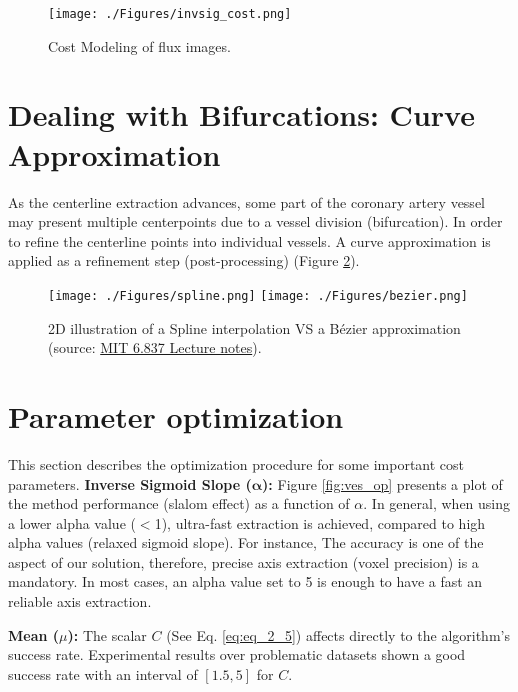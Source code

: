 \begin{figure}[ht]
	\centering
		\texttt{[image: ./Figures/invsig\_cost.png]}
	\caption[Cost Function]{Cost Modeling of flux images.}
	\label{fig:inv_cost}
\end{figure}

\section{Dealing with Bifurcations: Curve Approximation}\label{cent:bezi}

As the centerline extraction advances, some part of the coronary artery vessel may present multiple centerpoints due to a vessel division (bifurcation). In order to refine the centerline points into individual vessels. A curve approximation \citep{Bartels1998} is applied as a refinement step (post-processing) (Figure \ref{fig:sp_vs_bz}). 

\begin{figure}[ht]
	\centering
		\texttt{[image: ./Figures/spline.png]}
		\texttt{[image: ./Figures/bezier.png]}
	\caption[Spline interpolation VS B\'ezier approximation]{2D illustration of a Spline interpolation VS a B\'ezier approximation  (source: \href{http://ocw.mit.edu/courses/electrical-engineering-and-computer-science/6-837-computer-graphics-fall-2003/index.htm}{MIT 6.837 Lecture notes}).}
	\label{fig:sp_vs_bz}
\end{figure}


\section{Parameter optimization}\label{cent:opt}

This section describes the optimization procedure for some important cost parameters.
\textbf{Inverse Sigmoid Slope (}$\mathbf{\alpha}$\textbf{):} Figure \ref{fig:ves_op} presents a plot of the method performance (slalom effect) as a function of $\alpha$. In general, when using a lower alpha value ($<$1), ultra-fast extraction is achieved, compared to high alpha values (relaxed sigmoid slope). For instance, The accuracy is one of the aspect of our solution, therefore, precise axis extraction (voxel precision) is a mandatory. In most cases, an alpha value set to 5 is enough to have a fast an reliable axis extraction.

\textbf{Mean (}$\mu$\textbf{):} The scalar $C$ (See Eq. \ref{eq:eq_2_5}) affects directly to the algorithm's success rate. Experimental results over problematic datasets shown a good success rate with an interval of $\left[1.5 ,5\right] $ for $C$.

